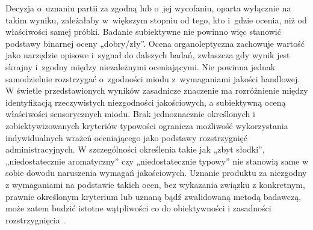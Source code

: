 Decyzja o~uznaniu partii za zgodną lub o~jej wycofaniu, oparta wyłącznie na
takim wyniku, zależałaby w~większym stopniu od tego, kto i~gdzie ocenia, niż
od właściwości samej próbki. Badanie subiektywne nie powinno więc stanowić
podstawy binarnej oceny „dobry/zły''. Ocena organoleptyczna zachowuje wartość
jako narzędzie opisowe i~sygnał do dalszych badań, zwłaszcza gdy wynik jest
skrajny i~zgodny między niezależnymi oceniającymi. Nie powinna jednak
samodzielnie rozstrzygać o~zgodności miodu z~wymaganiami jakości handlowej.
W świetle przedstawionych wyników zasadnicze znaczenie ma rozróżnienie między 
identyfikacją rzeczywistych niezgodności jakościowych, a subiektywną oceną właściwości 
sensorycznych miodu. Brak jednoznacznie określonych i zobiektywizowanych
 kryteriów typowości ogranicza możliwość wykorzystania indywidualnych 
 wrażeń oceniającego jako podstawy rozstrzygnięć administracyjnych. 
 W szczególności określenia takie jak „zbyt słodki”, „niedostatecznie aromatyczny” 
 czy „niedostatecznie typowy” nie stanowią same w sobie dowodu naruszenia wymagań 
 jakościowych. Uznanie produktu za niezgodny z wymaganiami na podstawie takich ocen, 
 bez wykazania związku z konkretnym, prawnie określonym kryterium 
 lub uznaną bądź zwalidowaną metodą badawczą, może zatem budzić istotne wątpliwości 
 co do obiektywności i zasadności rozstrzygnięcia 
\cite[art.~34]{Rozporzadzenie2017625}.
